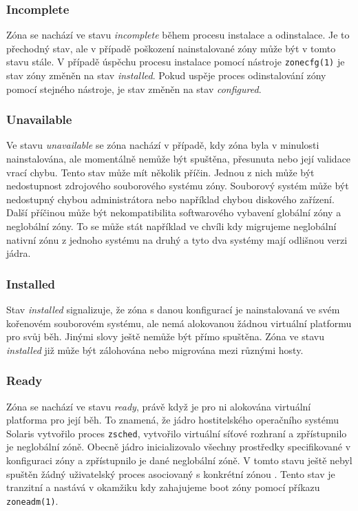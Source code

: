 \subsubsection{Incomplete}
\label{chapter:zones:administration:states:incomplete}
Zóna se nachází ve stavu \textit{incomplete} během procesu instalace a odinstalace. Je to přechodný stav, ale v případě poškození
nainstalované zóny může být v tomto stavu stále. V případě úspěchu procesu instalace pomocí nástroje \verb|zonecfg(1)| je 
stav zóny změněn na stav \textit{installed}. Pokud uspěje proces odinstalování zóny pomocí stejného nástroje, je stav
změněn na stav \textit{configured}.
\subsubsection{Unavailable}
\label{chapter:zones:administration:states:unavailable}
Ve stavu \textit{unavailable} se zóna nachází v případě, kdy zóna byla v minulosti nainstalována, ale momentálně nemůže být
spuštěna, přesunuta nebo její validace vrací chybu. Tento stav může mít několik příčin. Jednou z nich může být nedostupnost
zdrojového souborového systému zóny. Souborový systém může být nedostupný chybou administrátora nebo například chybou diskového
zařízení. Další příčinou může být nekompatibilita softwarového vybavení globální zóny a neglobální zóny. To se může stát například
ve chvíli kdy migrujeme neglobální nativní zónu z jednoho systému na druhý a tyto dva systémy mají odlišnou verzi jádra.
\subsubsection{Installed}
\label{chapter:zones:administration:states:installed}
Stav \textit{installed} signalizuje, že zóna s danou konfigurací je nainstalovaná ve svém kořenovém souborovém systému,
ale nemá alokovanou žádnou virtuální platformu pro svůj běh. Jinými slovy ještě nemůže být přímo spuštěna. Zóna ve stavu
\textit{installed} již může být zálohována nebo migrována mezi různými hosty. 
\subsubsection{Ready}
\label{chapter:zones:administration:states:ready}
Zóna se nachází ve stavu \textit{ready}, právě když je pro ni alokována virtuální platforma pro její běh. To znamená, že jádro
hostitelského operačního systému Solaris vytvořilo proces \verb|zsched|, vytvořilo virtuální síťové rozhraní a zpřístupnilo
je neglobální zóně. Obecně jádro inicializovalo všechny prostředky specifikované v konfiguraci zóny a zpřístupnilo je dané
neglobální zóně. V tomto stavu ještě nebyl spuštěn žádný uživatelský proces asociovaný s konkrétní zónou \cite{oracle:solaris:zones:states}.
Tento stav je tranzitní a nastává v okamžiku kdy zahajujeme boot zóny pomocí příkazu \verb|zoneadm(1)|.
